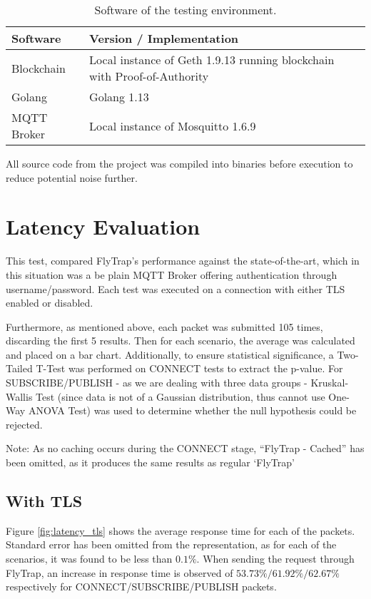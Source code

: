 \begin{table}[h]
\centering
\begin{tabular}{|l|l|}
\hline
\textbf{Software} & \textbf{Version / Implementation}                                        \\ \hline
Blockchain        & Local instance of Geth 1.9.13 running blockchain with Proof-of-Authority \\ \hline
Golang            & Golang 1.13                                                              \\ \hline
MQTT Broker       & Local instance of Mosquitto 1.6.9                                        \\ \hline
\end{tabular}
\caption{Software of the testing environment.}
\label{tab:sw}
\end{table}

All source code from the project was compiled into binaries before execution to reduce potential noise further.

\section{Latency Evaluation}
This test, compared FlyTrap's performance against the state-of-the-art, which in this situation was a be plain MQTT Broker offering authentication through username/password. Each test was executed on a connection with either TLS enabled or disabled.

Furthermore, as mentioned above, each packet was submitted 105 times, discarding the first 5 results. Then for each scenario, the average was calculated and placed on a bar chart. Additionally, to ensure statistical significance, a Two-Tailed T-Test was performed on CONNECT tests to extract the p-value. For SUBSCRIBE/PUBLISH - as we are dealing with three data groups - Kruskal-Wallis Test (since data is not of a Gaussian distribution, thus cannot use One-Way ANOVA Test) was used to determine whether the null hypothesis could be rejected.

Note: As no caching occurs during the CONNECT stage, ``FlyTrap - Cached'' has been omitted, as it produces the same results as regular `FlyTrap'

\subsection{With TLS}\label{sec:tls_eval}
Figure \ref{fig:latency_tls} shows the average response time for each of the packets. Standard error has been omitted from the representation, as for each of the scenarios, it was found to be less than $0.1\%$. When sending the request through FlyTrap, an increase in response time is observed of $53.73\%/61.92\%/62.67\%$ respectively for CONNECT/SUBSCRIBE/PUBLISH packets.

